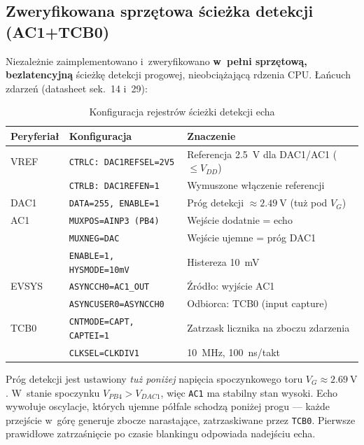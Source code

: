 \documentclass[a4paper,11pt]{article}
\begin{document}
\subsection{Zweryfikowana sprzętowa ścieżka detekcji (AC1+TCB0)}
\label{sec:hw_capture}

Niezależnie zaimplementowano i~zweryfikowano \textbf{w~pełni sprzętową,
bezlatencyjną} ścieżkę detekcji progowej, nieobciążającą rdzenia CPU. Łańcuch
zdarzeń (datasheet sek.~14 i~29):

\begin{table}[H]
	\centering
	\caption{Konfiguracja rejestrów ścieżki detekcji echa}
	\label{tab:rejestry}
	\footnotesize
	\begin{tabularx}{\textwidth}{llX}
		\toprule
		\textbf{Peryferiał} & \textbf{Konfiguracja} & \textbf{Znaczenie} \\
		\midrule
		VREF & \texttt{CTRLC: DAC1REFSEL=2V5} & Referencja \SI{2,5}{\volt} dla DAC1/AC1 ($\leq V_{DD}$) \\
		     & \texttt{CTRLB: DAC1REFEN=1} & Wymuszone włączenie referencji \\
		DAC1 & \texttt{DATA=255, ENABLE=1} & Próg detekcji $\approx\SI{2,49}{\volt}$ (tuż pod $V_G$) \\
		AC1  & \texttt{MUXPOS=AINP3 (PB4)} & Wejście dodatnie = echo \\
		     & \texttt{MUXNEG=DAC} & Wejście ujemne = próg DAC1 \\
		     & \texttt{ENABLE=1, HYSMODE=10mV} & Histereza \SI{10}{\milli\volt} \\
		EVSYS & \texttt{ASYNCCH0=AC1\_OUT} & Źródło: wyjście AC1 \\
		      & \texttt{ASYNCUSER0=ASYNCCH0} & Odbiorca: TCB0 (input capture) \\
		TCB0  & \texttt{CNTMODE=CAPT, CAPTEI=1} & Zatrzask licznika na zboczu zdarzenia \\
		      & \texttt{CLKSEL=CLKDIV1} & \SI{10}{\mega\hertz}, \SI{100}{\nano\second}/takt \\
		\bottomrule
	\end{tabularx}
\end{table}

Próg detekcji jest ustawiony \emph{tuż poniżej} napięcia spoczynkowego toru
$V_G\approx\SI{2,69}{\volt}$. W~stanie spoczynku $V_{PB4}>V_{DAC1}$, więc
\texttt{AC1} ma stabilny stan wysoki. Echo wywołuje oscylacje, których
ujemne półfale schodzą poniżej progu --- każde przejście w~górę generuje
zbocze narastające, zatrzaskiwane przez \texttt{TCB0}. Pierwsze prawidłowe
zatrzaśnięcie po czasie blankingu odpowiada nadejściu echa.
\end{document}
